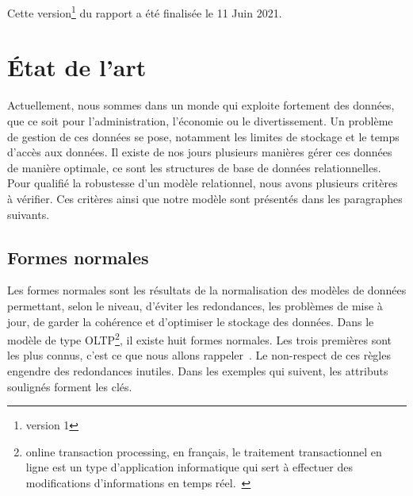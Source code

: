 \documentclass[12pt]{article}
\begin{document}
    Cette version\footnote{version 1} du rapport a été finalisée le 11 Juin 2021.

\newpage

\section{État de l'art}
    Actuellement, nous sommes dans un monde qui exploite fortement des données, que ce soit pour l'administration, l'économie ou le divertissement. Un problème de gestion de ces données se pose, notamment les limites de stockage et le temps d'accès aux données. Il existe de nos jours plusieurs manières gérer ces données de manière optimale, ce sont les structures de base de données relationnelles. Pour qualifié la robustesse d'un modèle relationnel, nous avons plusieurs critères à vérifier. Ces critères ainsi que notre modèle sont présentés dans les paragraphes suivants. 
    \subsection{Formes normales}
        Les formes normales sont les résultats de la normalisation des modèles de données permettant, selon le niveau, d'éviter les redondances, les problèmes de mise à jour, de garder la cohérence et d'optimiser le stockage des données. Dans le modèle de type OLTP\footnote{online transaction processing, en français, le traitement transactionnel en ligne est un type d'application informatique qui sert à effectuer des modifications d'informations en temps réel.~\cite{oltp}}, il existe huit formes normales. Les trois premières sont les plus connus, c'est ce que nous allons rappeler~\cite{fn}. Le non-respect de ces règles engendre des redondances inutiles. Dans les exemples qui suivent, les attributs soulignés forment les clés.
\end{document}
